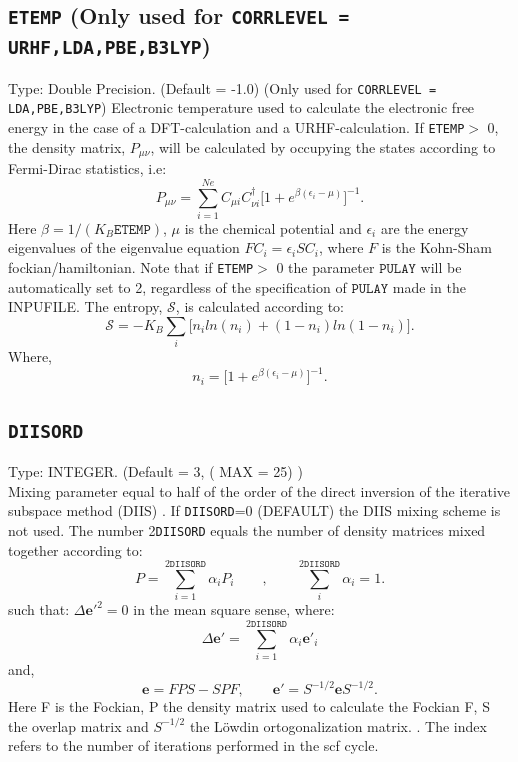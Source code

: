 \documentclass[a4paper,twoside,openany]{book}
\begin{document}
{{{{\subsection{\texttt{ETEMP}  (Only used for \texttt{CORRLEVEL = URHF,LDA,PBE,B3LYP})}
Type: Double Precision. (Default = -1.0) (Only used for \texttt{CORRLEVEL = LDA,PBE,B3LYP})
Electronic temperature used to calculate the electronic free energy in the case of a DFT-calculation and a URHF-calculation. If \texttt{ETEMP}$>$ 0, the density matrix, $P_{\mu\nu}$, will be calculated by occupying the states according to 
Fermi-Dirac statistics, i.e:
\begin{equation}
P_{\mu\nu} =  \sum_{i=1}^{Ne}C_{\mu i}C_{\nu i}^{\dagger} \Big [1 + e^{\beta(\epsilon_{i} - \mu) } \Big ]^{-1}.
\end{equation}
Here $\beta = 1/(K_{B}\texttt{ETEMP})$, $\mu$ is the chemical potential and $\epsilon_{i}$ are the energy eigenvalues of the eigenvalue equation $FC_{i}=\epsilon_{i}SC_{i}$, where $F$ is the Kohn-Sham fockian/hamiltonian.
 Note that if  \texttt{ETEMP}$>$ 0  the parameter $\texttt{PULAY}$ will be automatically set to 2, regardless of 
the specification of  $\texttt{PULAY}$ made in the INPUFILE. The entropy, $\mathcal{S}$, is calculated according to:
\begin{equation}
\mathcal{S} = -K_{B}\sum_{i}\Big [ n_{i}ln(n_{i}) + (1-n_{i})ln(1-n_{i} ) \Big ].
\end{equation}
Where,
\begin{equation}
n_{i} = \Big [1 + e^{\beta(\epsilon_{i} - \mu) } \Big ]^{-1}.
\end{equation}

\subsection{\texttt{DIISORD}}
Type: INTEGER. (Default = 3, ( MAX = 25) )\\
Mixing parameter equal to half of the order of the  direct inversion of  the iterative subspace method (DIIS) \cite{DIIS,DIIS2}. If \texttt{DIISORD}=0 (DEFAULT) the DIIS mixing scheme 
is not used.  The number 2\texttt{DIISORD} equals the number of density matrices mixed together according to:
\begin{equation}
P = \sum_{i=1}^{2\texttt{DIISORD}}\alpha_{i}P_{i}\qquad, \qquad \sum_{i}^{2\texttt{DIISORD}}\alpha_{i}=1.
\end{equation}
such that: $\Delta \mathbf{e'}^{2} = 0$ in the mean square sense, where:
\begin{equation}
\Delta \mathbf{e'} = \sum_{i=1}^{2\texttt{DIISORD}}\alpha_{i}\mathbf{e'}_{i}
\end{equation}
and,
\begin{equation}
\mathbf{e} = FPS-SPF, \qquad \mathbf{e'}=S^{-1/2}\mathbf{e}S^{-1/2}.
\end{equation}
Here F is the Fockian, P the density matrix used to calculate the Fockian F, S the overlap matrix and $S^{-1/2}$ the L\"owdin ortogonalization matrix.
. The index refers to the number of iterations performed 
in the scf cycle. 
 
}}}}
\end{document}
